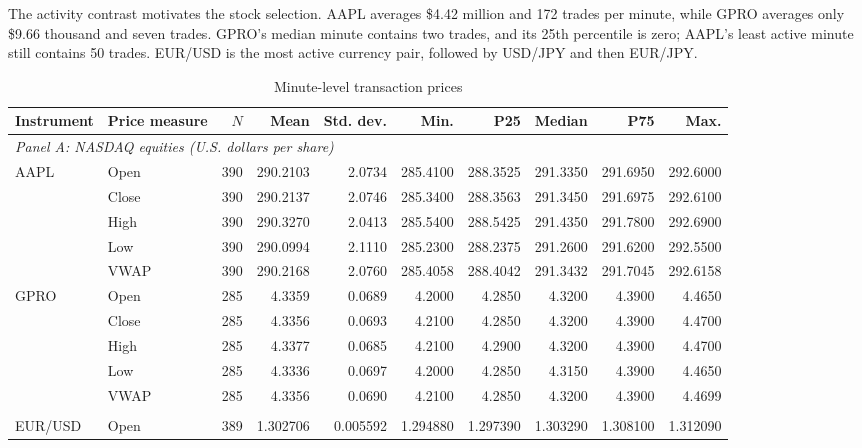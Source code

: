 \documentclass[11pt]{article}
\begin{document}
The activity contrast motivates the stock selection. AAPL averages \$4.42 million and 172 trades per minute, while GPRO averages only \$9.66 thousand and seven trades. GPRO's median minute contains two trades, and its 25th percentile is zero; AAPL's least active minute still contains 50 trades. EUR/USD is the most active currency pair, followed by USD/JPY and then EUR/JPY.

\begin{landscape}
\begin{table}[H]
\centering
\caption{Minute-level transaction prices}
\label{tab:prices}
\scriptsize
\begin{threeparttable}
\begin{tabular}{@{}llrrrrrrrr@{}}
\toprule
Instrument & Price measure & $N$ & Mean & Std. dev. & Min. & P25 & Median & P75 & Max.\\
\midrule
\multicolumn{10}{l}{\textit{Panel A: NASDAQ equities (U.S. dollars per share)}}\\
AAPL & Open  & 390 & 290.2103 & 2.0734 & 285.4100 & 288.3525 & 291.3350 & 291.6950 & 292.6000\\
     & Close & 390 & 290.2137 & 2.0746 & 285.3400 & 288.3563 & 291.3450 & 291.6975 & 292.6100\\
     & High  & 390 & 290.3270 & 2.0413 & 285.5400 & 288.5425 & 291.4350 & 291.7800 & 292.6900\\
     & Low   & 390 & 290.0994 & 2.1110 & 285.2300 & 288.2375 & 291.2600 & 291.6200 & 292.5500\\
     & VWAP  & 390 & 290.2168 & 2.0760 & 285.4058 & 288.4042 & 291.3432 & 291.7045 & 292.6158\\
GPRO & Open  & 285 & 4.3359 & 0.0689 & 4.2000 & 4.2850 & 4.3200 & 4.3900 & 4.4650\\
     & Close & 285 & 4.3356 & 0.0693 & 4.2100 & 4.2850 & 4.3200 & 4.3900 & 4.4700\\
     & High  & 285 & 4.3377 & 0.0685 & 4.2100 & 4.2900 & 4.3200 & 4.3900 & 4.4700\\
     & Low   & 285 & 4.3336 & 0.0697 & 4.2000 & 4.2850 & 4.3150 & 4.3900 & 4.4650\\
     & VWAP  & 285 & 4.3356 & 0.0690 & 4.2100 & 4.2850 & 4.3200 & 4.3900 & 4.4699\\
\addlinespace
\multicolumn{10}{l}{\textit{Panel B: Foreign exchange (quote currency per unit of base currency)}}\\
EUR/USD & Open  & 389 & 1.302706 & 0.005592 & 1.294880 & 1.297390 & 1.303290 & 1.308100 & 1.312090\\

\end{tabular}
\end{threeparttable}
\end{table}
\end{landscape}
\end{document}
